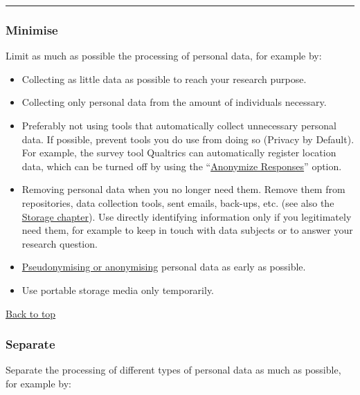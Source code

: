 \documentclass[
]{book}
\providecommand{\tightlist}{%
  \setlength{\itemsep}{0pt}\setlength{\parskip}{0pt}}
\begin{document}
\begin{center}\rule{0.5\linewidth}{0.5pt}\end{center}

\hypertarget{minimise}{%
\subsubsection{\texorpdfstring{ Minimise}{ Minimise}}\label{minimise}}

Limit as much as possible the processing of personal data, for example by:

\begin{itemize}
\tightlist
\item
  Collecting as little data as possible to reach your research purpose.
\item
  Collecting only personal data from the amount of individuals necessary.
\item
  Preferably not using tools that automatically collect unnecessary personal
  data. If possible, prevent tools you do use from doing so (Privacy by Default).
  For example, the survey tool Qualtrics can automatically register location data,
  which can be turned off by using the
  ``\href{https://www.qualtrics.com/support/survey-platform/survey-module/survey-options/survey-protection/\#AnonymizingResponses}{Anonymize Responses}''
  option.
\item
  Removing personal data when you no longer need them. Remove them from
  repositories, data collection tools, sent emails, back-ups, etc. (see also the
  \protect\hyperlink{data-storage}{Storage chapter}). Use directly identifying
  information only if you legitimately need them, for example to keep in touch
  with data subjects or to answer your research question.
\item
  \protect\hyperlink{pseudonymisation-anonymisation}{Pseudonymising or anonymising} personal
  data as early as possible.
\item
  Use portable storage media only temporarily.
\end{itemize}

\protect\hyperlink{data-oriented-strategies}{Back to top}

\hypertarget{separate}{%
\subsubsection{\texorpdfstring{ Separate}{ Separate}}\label{separate}}

Separate the processing of different types of personal data as much as possible,
for example by:
\end{document}
